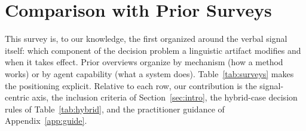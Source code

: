 \section{Comparison with Prior Surveys}
\label{app:surveys}
{\ifmarkup\color{red}\fi
This survey is, to our knowledge, the first organized around the verbal signal itself: which component of the decision problem a linguistic artifact modifies and when it takes effect. Prior overviews organize by mechanism (how a method works) or by agent capability (what a system does). Table~\ref{tab:surveys} makes the positioning explicit. Relative to each row, our contribution is the signal-centric axis, the inclusion criteria of Section~\ref{sec:intro}, the hybrid-case decision rules of Table~\ref{tab:hybrid}, and the practitioner guidance of Appendix~\ref{app:guide}.

}
